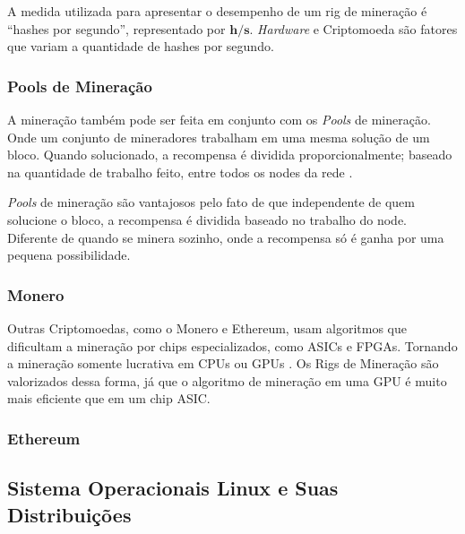 \documentclass[
article,			%
12pt,				%
openright,			%
oneside,			%
a4paper,			%
chapter=TITLE,		%
section=TITLE,		%
subsection=TITLE,	%
subsubsection=TITLE,%
subsubsubsection=TITLE, %
english,			%
brazil,				%
]{abntex2}
\begin{document}
\pagebreak

A medida utilizada para apresentar o desempenho de um rig de mineração
é ``hashes por segundo'', representado por $\mathbf{h/s}$.
\emph{Hardware} e Criptomoeda são fatores que variam a quantidade de
hashes por segundo.

\subsubsection{Pools de Mineração}

A mineração também pode ser feita em conjunto com os \emph{Pools} de
mineração. Onde um conjunto de mineradores trabalham em uma mesma
solução de um bloco. Quando solucionado, a recompensa é dividida
proporcionalmente; baseado na quantidade de trabalho feito, entre
todos os nodes da rede \cite{Weber2012}.

\emph{Pools} de mineração são vantajosos pelo fato de que independente
de quem solucione o bloco, a recompensa é dividida baseado no trabalho
do node. Diferente de quando se minera sozinho, onde a recompensa só é
ganha por uma pequena possibilidade.

\subsubsection{Monero}

Outras Criptomoedas, como o Monero e Ethereum, usam algoritmos que
dificultam a mineração por chips especializados, como ASICs e FPGAs.
Tornando a mineração somente lucrativa em CPUs ou GPUs
\cite{Weber2012}. Os Rigs de Mineração são valorizados dessa forma, já
que o algoritmo de mineração em uma GPU é muito mais eficiente que em
um chip ASIC\@.

\subsubsection{Ethereum}

\subsection{Sistema Operacionais Linux e Suas Distribuições}
\end{document}
